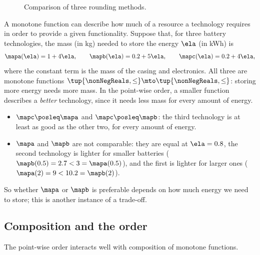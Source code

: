 \begin{figure}[b]
    \centering
    \hfill
    \hfill
    \caption{Comparison of three rounding methods.}
\end{figure}

\begin{example}
    \label{exa:battery-technologies}
    A monotone function can describe how much of a resource a technology requires in order to provide a given functionality.
    Suppose that, for three battery technologies, the mass (in kg) needed to store the energy $\ela$ (in kWh) is
    \begin{equation}
        \mapa(\ela) = 1 + 4 \ela,
        \qquad
        \mapb(\ela) = 0.2 + 5 \ela,
        \qquad
        \mapc(\ela) = 0.2 + 4 \ela,
    \end{equation}
    where the constant term is the mass of the casing and electronics.
    All three are monotone functions $\tup{\nonNegReals, \leq} \mto \tup{\nonNegReals, \leq}$: storing more energy needs more mass.
    In the point-wise order, a smaller function describes a \emph{better} technology, since it needs less mass for every amount of energy.
    \begin{itemize}
        \item $\mapc \posleq \mapa$ and $\mapc \posleq \mapb$: the third technology is at least as good as the other two, for every amount of energy.
        \item $\mapa$ and $\mapb$ are not comparable: they are equal at $\ela = 0.8$, the second technology is lighter for smaller batteries ($\mapb(0.5) = 2.7 < 3 = \mapa(0.5)$), and the first is lighter for larger ones ($\mapa(2) = 9 < 10.2 = \mapb(2)$).
    \end{itemize}
    So whether $\mapa$ or $\mapb$ is preferable depends on how much energy we need to store; this is another instance of a trade-off.
\end{example}

\subsection{Composition and the order}

The point-wise order interacts well with composition of monotone functions.

